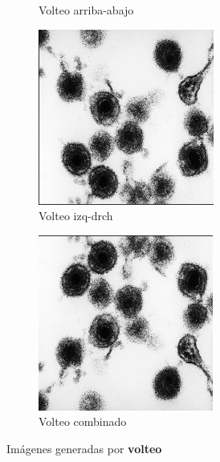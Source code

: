 \documentclass{uc3mpracticas}
\begin{document}
\begin{figure}[!h]
\begin{subfigure}[b]{0.23\textwidth}
      \caption{Volteo arriba-abajo}
    \end{subfigure}
    \hfill
    \begin{subfigure}[b]{0.23\textwidth}
      \includegraphics[width=\textwidth, frame]{Images/voltIzqDrch.png}
      \caption{Volteo izq-drch}
    \end{subfigure}
    \hfill
    \begin{subfigure}[b]{0.23\textwidth}
      \includegraphics[width=\textwidth, frame]{Images/voltIDAA.png}
      \caption{Volteo combinado}
    \end{subfigure}

    \caption{Imágenes generadas por \textbf{volteo}}
  \end{figure}
\end{document}
